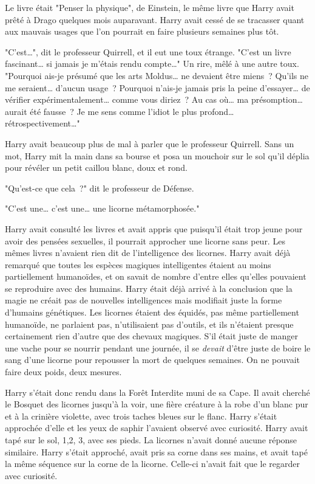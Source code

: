 Le livre était "Penser la physique", de Einstein, le même livre que Harry avait prêté à Drago quelques mois auparavant. Harry avait cessé de se tracasser quant aux mauvais usages que l'on pourrait en faire plusieurs semaines plus tôt.

"C'est…", dit le professeur Quirrell, et il eut une toux étrange. "C'est un livre fascinant… si jamais je m'étais rendu compte…" Un rire, mêlé à une autre toux. "Pourquoi ais-je présumé que les arts Moldus… ne devaient être miens~? Qu'ils ne me seraient… d'aucun usage~? Pourquoi n'ais-je jamais pris la peine d'essayer… de vérifier expérimentalement… comme vous diriez~? Au cas où… ma présomption… aurait été fausse~? Je me sens comme l'idiot le plus profond… rétrospectivement…"

Harry avait beaucoup plus de mal à parler que le professeur Quirrell. Sans un mot, Harry mit la main dans sa bourse et posa un mouchoir sur le sol qu'il déplia pour révéler un petit caillou blanc, doux et rond.

"Qu'est-ce que cela~?" dit le professeur de Défense.

"C'est une… c'est une… une licorne métamorphosée."

Harry avait consulté les livres et avait appris que puisqu'il était trop jeune pour avoir des pensées sexuelles, il pourrait approcher une licorne sans peur. Les mêmes livres n'avaient rien dit de l'intelligence des licornes. Harry avait déjà remarqué que toutes les espèces magiques intelligentes étaient au moins partiellement humanoïdes, et on savait de nombre d'entre elles qu'elles pouvaient se reproduire avec des humains. Harry était déjà arrivé à la conclusion que la magie ne créait pas de nouvelles intelligences mais modifiait juste la forme d'humains génétiques. Les licornes étaient des équidés, pas même partiellement humanoïde, ne parlaient pas, n'utilisaient pas d'outils, et ils n'étaient presque certainement rien d'autre que des chevaux magiques. S'il était juste de manger une vache pour se nourrir pendant une journée, il se \emph{devait} d'être juste de boire le sang d'une licorne pour repousser la mort de quelques semaines. On ne pouvait faire deux poids, deux mesures.

Harry s'était donc rendu dans la Forêt Interdite muni de sa Cape. Il avait cherché le Bosquet des licornes jusqu'à la voir, une fière créature à la robe d'un blanc pur et à la crinière violette, avec trois taches bleues sur le flanc. Harry s'était approchée d'elle et les yeux de saphir l'avaient observé avec curiosité. Harry avait tapé sur le sol, 1,2, 3, avec ses pieds. La licornes n'avait donné aucune réponse similaire. Harry s'était approché, avait pris sa corne dans ses mains, et avait tapé la même séquence sur la corne de la licorne. Celle-ci n'avait fait que le regarder avec curiosité.

